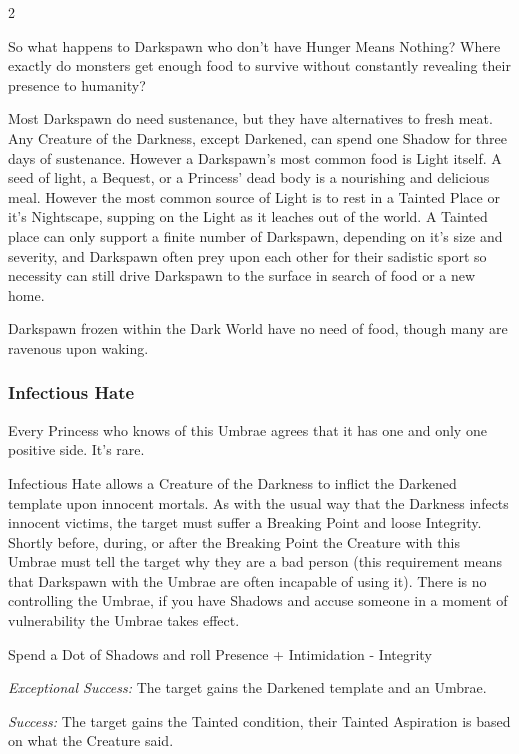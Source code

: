 \begin{multicols}{2}
\begin{mybox}
So what happens to Darkspawn who don't have Hunger Means Nothing? Where exactly do monsters get enough food to survive without constantly revealing their presence to humanity? 

Most Darkspawn do need sustenance, but they have alternatives to fresh meat. Any Creature of the Darkness, except Darkened, can spend one Shadow for three days of sustenance. However a Darkspawn's most common food is Light itself. A seed of light, a Bequest, or a Princess' dead body is a nourishing and delicious meal. However the most common source of Light is to rest in a Tainted Place or it's Nightscape, supping on the Light as it leaches out of the world. A Tainted place can only support a finite number of Darkspawn, depending on it's size and severity, and Darkspawn often prey upon each other for their sadistic sport so necessity can still drive Darkspawn to the surface in search of food or a new home. 

Darkspawn frozen within the Dark World have no need of food, though many are ravenous upon waking.

\end{mybox}

\subsubsection*{Infectious Hate}

Every Princess who knows of this Umbrae agrees that it has one and only one positive side. It's rare.

Infectious Hate allows a Creature of the Darkness to inflict the Darkened template upon innocent mortals. As with the usual way that the Darkness infects innocent victims, the target must suffer a Breaking Point and loose Integrity. Shortly before, during, or after the Breaking Point the Creature with this Umbrae must tell the target why they are a bad person (this requirement means that Darkspawn with the Umbrae are often incapable of using it). There is no controlling the Umbrae, if you have Shadows and accuse someone in a moment of vulnerability the Umbrae takes effect.

Spend a Dot of Shadows and roll Presence + Intimidation - Integrity

\textit{Exceptional Success:} The target gains the Darkened template and an Umbrae.

\textit{Success:} The target gains the Tainted condition, their Tainted Aspiration is based on what the Creature said.


\end{multicols}
